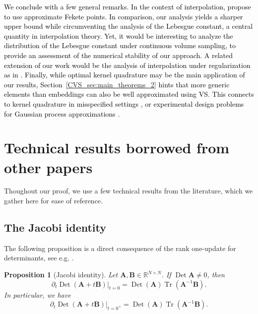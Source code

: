 \documentclass[twoside,11pt]{book}
\newcommand{\rev}[1]{\textcolor{black}{#1}}
\newtheorem{proposition}{Proposition}
\numberwithin{theorem}{chapter}
\numberwithin{definition}{chapter}
\numberwithin{proposition}{chapter}
\numberwithin{corollary}{chapter}
\numberwithin{example}{chapter}
\numberwithin{lemma}{chapter}
\numberwithin{assumption}{chapter}
\numberwithin{equation}{chapter}
\numberwithin{figure}{chapter}
\DeclareMathOperator{\Tr}{Tr}
\DeclareMathOperator{\Det}{Det}
\begin{document}
\rev{We conclude with a few general remarks.}
\rev{
In the context of interpolation, \citep{KaSaTa19} propose to use approximate Fekete points. In comparison, our analysis yields a sharper upper bound while circumventing the analysis of the Lebesgue constant, a central quantity in interpolation theory. Yet, it would be interesting to analyze the distribution of the Lebesgue constant under continuous volume sampling, to provide an assessment of the numerical stability of our approach. A related extension of our work would be the analysis of interpolation under regularization as in \citep{Bac17}.
Finally, while optimal kernel quadrature may be the main application of our results, Section~\ref{CVS_sec:main_theorems_2} hints that more generic elements than embeddings can also be well approximated using VS. This connects to kernel quadrature in misspecified settings \citep{KaSrFu16}, or experimental design problems for Gaussian process approximations \citep{WyBrGi20}.
}

\section{Technical results borrowed from other papers}
Thoughout our proof, we use a few technical results from the literature, which we gather here for ease of reference.
\subsection{The Jacobi identity}
The following proposition is a direct consequence of the rank one-update for determinants, see e.g. \citep[Theorem 3.11]{MaSpSr15}.
\begin{proposition}[Jacobi identity]\label{CVS_thm:jacobi_identity}
Let $\bm{A}, \bm{B} \in \mathbb{R}^{N \times N}$. If $\Det\bm{A}\neq 0$, then
\begin{equation}
\partial_{t} \Det (\bm{A}+t\bm{B})|_{t = 0} = \Det(\bm{A}) \Tr(\bm{A}^{-1}\bm{B}).
\end{equation}
In particular, we have
\begin{equation}
\partial_{t} \Det (\bm{A}+t\bm{B})|_{t = 0^{+}} = \Det(\bm{A}) \Tr(\bm{A}^{-1}\bm{B}).
\end{equation}
\end{proposition}
\end{document}
